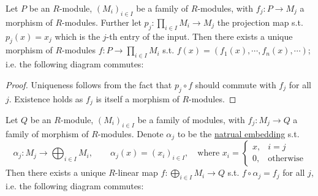 \begin{theorem}\label{thm:Universal Property of Direct Product}
    Let $P$ be an $R$-module, $(M_i)_{i\in I}$ be a family of $R$-modules, with $f_j: P \to M_j$ a morphism of $R$-modules. Further let $p_j : \prod_{i\in I} M_i \to M_j$ the projection map s.t. $p_j(x) = x_j$ which is the $j$-th entry of the input. Then there exists a unique morphism of $R$-modules $f: P\to\prod_{i\in I} M_i$ s.t. $f(x) = (f_1(x), \cdots, f_n(x), \cdots)$; i.e. the following diagram commutes:
    
    \begin{minipage}{\linewidth}
        \centering
    \end{minipage}
\end{theorem}

\begin{proof}
    Uniqueness follows from the fact that $p_j\circ f$ should commute with $f_j$ for all $j$. Existence holds as $f_j$ is itself a morphism of $R$-modules.
\end{proof}

\begin{theorem}\label{thm:Universal Property of Direct Sum}
    Let $Q$ be an $R$-module, $(M_i)_{i\in I}$ be a family of modules, with $f_j: M_j \to Q$ a family of morphism of $R$-modules. Denote $\alpha_j$ to be the \underline{natrual embedding} s.t.
    \[
        \alpha_j: M_j  \to \bigoplus_{i\in I} M_i, \qquad \alpha_j(x) = (x_i)_{i\in I}, \quad\text{where } x_i = \begin{cases} x, & i = j \\ 0, & \text{otherwise} \end{cases}
    \]
    Then there exists a unique $R$-linear map $f: \bigoplus_{i\in I} M_i \to Q$ s.t. $f\circ \alpha_j = f_j$ for all $j$, i.e. the following diagram commutes:
    
    \begin{minipage}{\linewidth}
        \centering
    \end{minipage}
\end{theorem}

